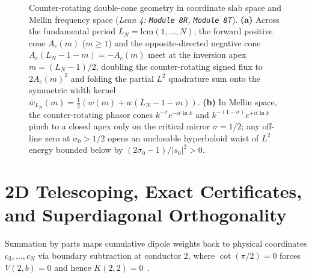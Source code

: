 \documentclass[10pt,a4paper]{article}
\theoremstyle{definition}
\begin{document}
\begin{figure}[htbp]
{%
}
\caption{Counter-rotating double-cone geometry in coordinate slab space and Mellin frequency space (\emph{Lean 4: \texttt{Module~8R}, \texttt{Module~8T}}). \textbf{(a)} Across the fundamental period $L_N = \mathrm{lcm}(1,\dots,N)$, the forward positive cone $A_c(m)$ ($m \ge 1$) and the opposite-directed negative cone $A_c(L_N-1-m) = -A_c(m)$ meet at the inversion apex $m = (L_N-1)/2$, doubling the counter-rotating signed flux to $2A_c(m)^2$ and folding the partial $L^2$ quadrature sum onto the symmetric width kernel $\bar{w}_{L_N}(m) = \frac{1}{2}(w(m) + w(L_N-1-m))$. \textbf{(b)} In Mellin space, the counter-rotating phasor cones $k^{-\sigma}e^{-it\ln k}$ and $k^{-(1-\sigma)}e^{+it\ln k}$ pinch to a closed apex only on the critical mirror $\sigma = 1/2$; any off-line zero at $\sigma_0 > 1/2$ opens an unclosable hyperboloid waist of $L^2$ energy bounded below by $(2\sigma_0 - 1)/|s_0|^2 > 0$.}
\label{fig:double_cone_counter_rotation}
\end{figure}

\section{2D Telescoping, Exact Certificates, and Superdiagonal Orthogonality}

Summation by parts maps cumulative dipole weights back to physical coordinates $c_3, \dots, c_N$ via boundary subtraction at conductor $2$, where $\cot(\pi/2) = 0$ forces $V(2,b) = 0$ and hence $K(2,2) = 0$~\cite{Titchmarsh1986}.
\end{document}

